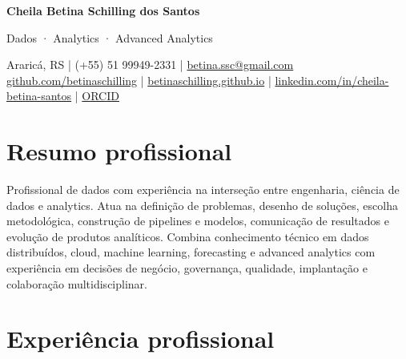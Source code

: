\documentclass[10pt,a4paper]{article}
\begin{document}
{\sffamily
{\fontsize{24}{27}\selectfont\bfseries Cheila Betina Schilling dos Santos}\par
\vspace{3pt}
{\large\color{red} Dados · Analytics · Advanced Analytics}\par
\vspace{5pt}
{\small
Araricá, RS \quad | \quad (+55) 51 99949-2331 \quad | \quad
\href{mailto:betina.ssc@gmail.com}{betina.ssc@gmail.com}\\
\href{https://github.com/betinaschilling}{github.com/betinaschilling} \quad | \quad
\href{https://betinaschilling.github.io/}{betinaschilling.github.io} \quad | \quad
\href{https://www.linkedin.com/in/cheila-betina-santos/}{linkedin.com/in/cheila-betina-santos} \quad | \quad
\href{https://orcid.org/0009-0008-6145-3587}{ORCID}
}\par
}

\section{Resumo profissional}

Profissional de dados com experiência na interseção entre engenharia, ciência de dados e analytics. Atua na definição de problemas, desenho de soluções, escolha metodológica, construção de pipelines e modelos, comunicação de resultados e evolução de produtos analíticos. Combina conhecimento técnico em dados distribuídos, cloud, machine learning, forecasting e advanced analytics com experiência em decisões de negócio, governança, qualidade, implantação e colaboração multidisciplinar.

\section{Experiência profissional}
\end{document}
